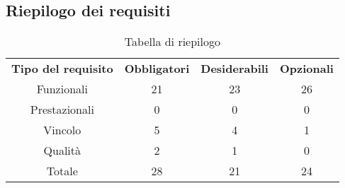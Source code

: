 \subsection{Riepilogo dei requisiti}
\begin{table}[h]
\centering
\begin{tabular}{| c | c | c | c |}
		\rowcolor{LightBlue}
		\color{white}\bfseries Tipo del requisito & \color{white}\bfseries Obbligatori & \color{white}\bfseries Desiderabili & \color{white}\bfseries Opzionali \\[0.25cm]
		 Funzionali & 21 & 23 & 26 \\
		 Prestazionali & 0 & 0 & 0 \\
		 Vincolo & 5 & 4 & 1 \\
		 Qualità & 2 & 1 & 0 \\
		 Totale & 28 & 21 & 24 \\ \hline
\end{tabular}
		\caption{Tabella di riepilogo}
\end{table}


\newpage